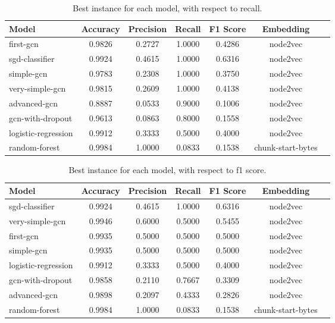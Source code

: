     \begin{table}
        \centering
        \caption{Best instance for each model, with respect to recall.}
        \begin{tabular}{|l|c|c|c|c|c|c|} \hline 
          \textbf{Model}  & \textbf{Accuracy} & \textbf{Precision} & \textbf{Recall} & \textbf{F1 Score} & \textbf{Embedding}  \\ \hline 
            first-gcn & 0.9826 & 0.2727 & 1.0000 & 0.4286 & node2vec \\ \hline 
            sgd-classifier & 0.9924 & 0.4615 & 1.0000 & 0.6316 & node2vec \\ \hline 
            simple-gcn & 0.9783 & 0.2308 & 1.0000 & 0.3750 & node2vec \\ \hline 
            very-simple-gcn & 0.9815 & 0.2609 & 1.0000 & 0.4138 & node2vec \\ \hline 
            advanced-gcn & 0.8887 & 0.0533 & 0.9000 & 0.1006 & node2vec \\ \hline 
            gcn-with-dropout & 0.9613 & 0.0863 & 0.8000 & 0.1558 & node2vec \\ \hline 
            logistic-regression & 0.9912 & 0.3333 & 0.5000 & 0.4000 & node2vec \\ \hline 
            random-forest & 0.9984 & 1.0000 & 0.0833 & 0.1538 & chunk-start-bytes \\ \hline 
        \end{tabular}
    \end{table}


    \begin{table}
        \centering
        \caption{Best instance for each model, with respect to f1 score.}
        \begin{tabular}{|l|c|c|c|c|c|c|} \hline 
          \textbf{Model}  & \textbf{Accuracy} & \textbf{Precision} & \textbf{Recall} & \textbf{F1 Score} & \textbf{Embedding}  \\ \hline 
            sgd-classifier & 0.9924 & 0.4615 & 1.0000 & 0.6316 & node2vec \\ \hline 
            very-simple-gcn & 0.9946 & 0.6000 & 0.5000 & 0.5455 & node2vec \\ \hline 
            first-gcn & 0.9935 & 0.5000 & 0.5000 & 0.5000 & node2vec \\ \hline 
            simple-gcn & 0.9935 & 0.5000 & 0.5000 & 0.5000 & node2vec \\ \hline 
            logistic-regression & 0.9912 & 0.3333 & 0.5000 & 0.4000 & node2vec \\ \hline 
            gcn-with-dropout & 0.9858 & 0.2110 & 0.7667 & 0.3309 & node2vec \\ \hline 
            advanced-gcn & 0.9898 & 0.2097 & 0.4333 & 0.2826 & node2vec \\ \hline 
            random-forest & 0.9984 & 1.0000 & 0.0833 & 0.1538 & chunk-start-bytes \\ \hline 
        \end{tabular}
    \end{table}


